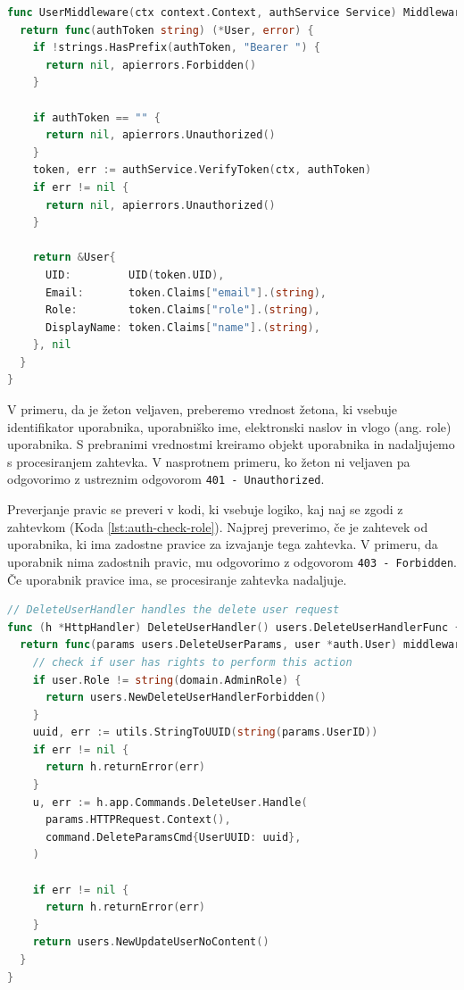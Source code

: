 \begin{lstlisting}[language=go,style=mystyle,caption={Izsek kode za preverjanje pristnosti uporabnika.},label=lst:auth-middleware]
func UserMiddleware(ctx context.Context, authService Service) MiddlewareFunc {
  return func(authToken string) (*User, error) {
    if !strings.HasPrefix(authToken, "Bearer ") {
      return nil, apierrors.Forbidden()
    }
    
    if authToken == "" {
      return nil, apierrors.Unauthorized()
    }
    token, err := authService.VerifyToken(ctx, authToken)
    if err != nil {
      return nil, apierrors.Unauthorized()
    }
    
    return &User{
      UID:         UID(token.UID),
      Email:       token.Claims["email"].(string),
      Role:        token.Claims["role"].(string),
      DisplayName: token.Claims["name"].(string),
    }, nil
  }
}
\end{lstlisting}

V primeru, da je žeton veljaven, preberemo vrednost žetona, ki vsebuje identifikator uporabnika, uporabniško ime, elektronski naslov in vlogo (ang. role) uporabnika. S prebranimi vrednostmi kreiramo objekt uporabnika in nadaljujemo s procesiranjem zahtevka. V nasprotnem primeru, ko žeton ni veljaven pa odgovorimo z ustreznim odgovorom \verb=401 - Unauthorized=. 

Preverjanje pravic se preveri v kodi, ki vsebuje logiko, kaj naj se zgodi z zahtevkom (Koda \ref{lst:auth-check-role}). Najprej preverimo, če je zahtevek od uporabnika, ki ima zadostne pravice za izvajanje tega zahtevka. V primeru, da uporabnik nima zadostnih pravic, mu odgovorimo z odgovorom \verb=403 - Forbidden=. Če uporabnik pravice ima, se procesiranje zahtevka nadaljuje.

\begin{lstlisting}[language=go,style=mystyle,caption={Izsek kode za preverjanje pravic uporabnika.},label=lst:auth-check-role]
// DeleteUserHandler handles the delete user request
func (h *HttpHandler) DeleteUserHandler() users.DeleteUserHandlerFunc {
  return func(params users.DeleteUserParams, user *auth.User) middleware.Responder {
    // check if user has rights to perform this action
    if user.Role != string(domain.AdminRole) {
      return users.NewDeleteUserHandlerForbidden()
    }
    uuid, err := utils.StringToUUID(string(params.UserID))
    if err != nil {
      return h.returnError(err)
    }
    u, err := h.app.Commands.DeleteUser.Handle(
      params.HTTPRequest.Context(), 
      command.DeleteParamsCmd{UserUUID: uuid},
    )

    if err != nil {
      return h.returnError(err)
    }
    return users.NewUpdateUserNoContent()
  }
}
\end{lstlisting}

